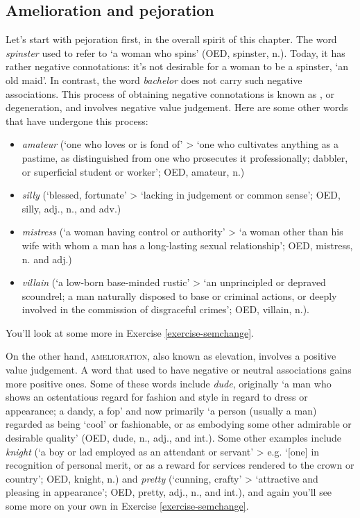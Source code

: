 \subsection{Amelioration and pejoration}\label{LModE-pejoration}
Let's start with pejoration first, in the overall spirit of this chapter. The word \textit{spinster} used to refer to `a woman who spins' (OED,  spinster, n.). Today, it has rather negative connotations: it's not desirable for a woman to be a spinster, `an old maid'. In contrast, the word \textit{bachelor} does not carry such negative associations. This process of obtaining negative connotations is known as , or degeneration, and involves negative value judgement. Here are some other words that have undergone this process:

\begin{itemize}
    \item \textit{amateur} (`one who loves or is fond of' > `one who cultivates anything as a pastime, as distinguished from one who prosecutes it professionally; dabbler, or superficial student or worker'; OED,  amateur, n.)
    \item \textit{silly} (`blessed, fortunate' > `lacking in judgement or common sense'; OED,  silly, adj., n., and adv.)
    \item \textit{mistress} (`a woman having control or authority' > `a woman other than his wife with whom a man has a long-lasting sexual relationship'; OED,  mistress, n. and adj.)
    \item \textit{villain} (`a low-born base-minded rustic' > `an unprincipled or depraved scoundrel; a man naturally disposed to base or criminal actions, or deeply involved in the commission of disgraceful crimes'; OED,  villain, n.).
\end{itemize}

\noindent You'll look at some more in Exercise \ref{exercise-semchange}.

On the other hand, \textsc{amelioration}, also known as elevation, involves a positive value judgement. A word that used to have negative or neutral associations gains more positive ones. Some of these words include \textit{dude}, originally `a man who shows an ostentatious regard for fashion and style in regard to dress or appearance; a dandy, a fop' and now primarily `a person (usually a man) regarded as being `cool' or fashionable, or as embodying some other admirable or desirable quality' (OED,  dude, n., adj., and int.). Some other examples include \textit{knight} (`a boy or lad employed as an attendant or servant' > e.g. `[one] in recognition of personal merit, or as a reward for services rendered to the crown or country'; OED,  knight, n.) and \textit{pretty} (`cunning, crafty' > `attractive and pleasing in appearance'; OED,  pretty, adj., n., and int.), and again you'll see some more on your own in Exercise \ref{exercise-semchange}.

